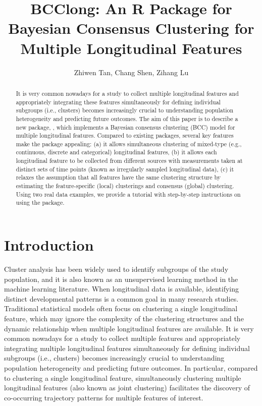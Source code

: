 \title{BCClong: An R Package for Bayesian Consensus Clustering for Multiple Longitudinal Features}
\author{ Zhiwen Tan,  Chang Shen, Zihang Lu}

\maketitle

\begin{abstract}
It is very common nowadays for a study to collect multiple longitudinal features and appropriately integrating these features simultaneously for defining individual subgroups (i.e., clusters) becomes increasingly crucial to understanding population heterogeneity and predicting future outcomes. The aim of this paper is to describe a new package, , which implements a Bayesian consensus clustering (BCC) model for multiple longitudinal features. Compared to existing packages, several key features make the  package appealing: (a) it allows simultaneous clustering of mixed-type (e.g., continuous, discrete and categorical) longitudinal features, (b) it allows each longitudinal feature to be collected from different sources with measurements taken at distinct sets of time points (known as irregularly sampled longitudinal data), (c) it relaxes the assumption that all features have the same clustering structure by estimating the feature-specific (local) clusterings and consensus (global) clustering. Using two real data examples, we provide a tutorial with step-by-step instructions on using the package. 
\end{abstract}

\section[Introduction]{Introduction} \label{sec:intro}
Cluster analysis has been widely used to identify subgroups of the study population, and it is also known as an unsupervised learning method in the machine learning literature.  When longitudinal data is available, identifying distinct developmental patterns is a common goal in many research studies. Traditional statistical models often focus on clustering a single longitudinal feature, which may ignore the complexity of the clustering structures and the dynamic relationship when multiple longitudinal features are available. It is very common nowadays for a study to collect multiple features and appropriately integrating multiple longitudinal features simultaneously for defining individual subgroups (i.e., clusters) becomes increasingly crucial to understanding population heterogeneity and predicting future outcomes. In particular, compared to clustering a single longitudinal feature, simultaneously clustering multiple longitudinal features (also known as joint clustering) facilitates the discovery of co-occurring trajectory patterns for multiple features of interest.

